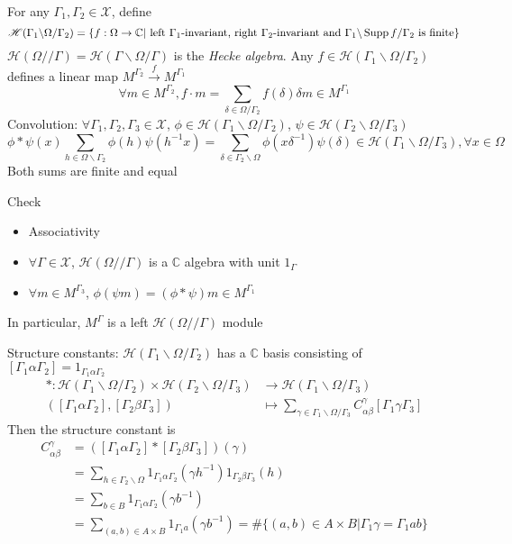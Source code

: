 \documentclass[main]{subfiles}
\begin{document}
\begin{definition}
For any $\Gamma_1,\Gamma_2\in\mathscr X$, define
\[\mathscr H(\Gamma_1\backslash\Omega/\Gamma_2)=\left\{f:\Omega\to\mathbb C\middle|\text{ left $\Gamma_1$-invariant, right $\Gamma_2$-invariant and $\Gamma_1\backslash\operatorname{Supp} f/\Gamma_2$ is finite}\right\}\]
$\mathscr H(\Omega//\Gamma)=\mathscr H(\Gamma\backslash\Omega/\Gamma)$ is the \textit{Hecke algebra}. Any $f\in\mathscr H(\Gamma_1\backslash\Omega/\Gamma_2)$ defines a linear map $M^{\Gamma_2}\xrightarrow fM^{\Gamma_1}$
\[\forall m\in M^{\Gamma_2},f\cdot m=\sum_{\delta\in\Omega/\Gamma_2}f(\delta)\delta m\in M^{\Gamma_1}\]
Convolution: $\forall \Gamma_1,\Gamma_2,\Gamma_3\in\mathscr X$, $\phi\in\mathscr H(\Gamma_1\backslash\Omega/\Gamma_2)$, $\psi\in \mathscr H(\Gamma_2\backslash\Omega/\Gamma_3)$
\[\phi*\psi(x)\sum_{h\in\Omega\backslash\Gamma_2}\phi(h)\psi(h^{-1}x)=\sum_{\delta\in\Gamma_2\backslash\Omega}\phi(x\delta^{-1})\psi(\delta)\in\mathscr H(\Gamma_1\backslash\Omega/\Gamma_3),\forall x\in\Omega\]
Both sums are finite and equal

Check
\begin{itemize}
\item Associativity
\item $\forall \Gamma\in\mathscr X$, $\mathscr H(\Omega//\Gamma)$ is a $\mathbb C$ algebra with unit $1_\Gamma$
\item $\forall m\in M^{\Gamma_3}$, $\phi(\psi m)=(\phi*\psi)m\in M^{\Gamma_1}$
\end{itemize}
In particular, $M^\Gamma$ is a left $\mathscr H(\Omega//\Gamma)$ module

Structure constants: $\mathscr H(\Gamma_1\backslash\Omega/\Gamma_2)$ has a $\mathbb C$ basis consisting of  $[\Gamma_1\alpha\Gamma_2]=1_{\Gamma_1\alpha\Gamma_2}$
\begin{align*}
*:\mathscr H(\Gamma_1\backslash\Omega/\Gamma_2)\times \mathscr H(\Gamma_2\backslash\Omega/\Gamma_3)&\to \mathscr H(\Gamma_1\backslash\Omega/\Gamma_3) \\
([\Gamma_1\alpha\Gamma_2],[\Gamma_2\beta\Gamma_3])&\mapsto\sum_{\gamma\in\Gamma_1\backslash\Omega/\Gamma_3}C^\gamma_{\alpha\beta}[\Gamma_1\gamma\Gamma_3]
\end{align*}
Then the structure constant is
\begin{align*}
C^\gamma_{\alpha\beta}&=([\Gamma_1\alpha\Gamma_2]*[\Gamma_2\beta\Gamma_3])(\gamma) \\
&=\sum_{h\in\Gamma_2\backslash\Omega}1_{\Gamma_1\alpha\Gamma_2}(\gamma h^{-1})1_{\Gamma_2\beta\Gamma_3}(h) \\
&=\sum_{b\in B}1_{\Gamma_1\alpha\Gamma_2}(\gamma b^{-1}) \\
&=\sum_{(a,b)\in A\times B}1_{\Gamma_1a}(\gamma b^{-1})=\#\{(a,b)\in A\times B|\Gamma_1\gamma=\Gamma_1ab\}
\end{align*}
\end{definition}
\end{document}
